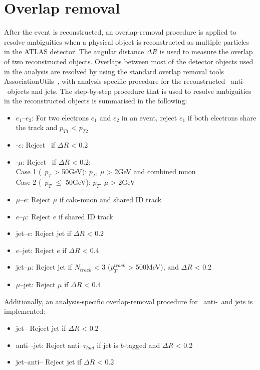 \section{Overlap removal}
After the event is reconstructed, an overlap-removal procedure is applied 
to resolve ambiguities when a physical object is reconstructed as multiple 
particles in the \hbox{ATLAS} detector. The angular distance $\Delta R$ is used 
to measure the overlap of two reconstructed objects.
Overlaps between most of the detector objects used in the analysis are resolved 
by using the standard overlap removal tools AssociationUtils~\cite{ORTool}, 
with analysis specific procedure for 
the reconstructed \tauhadvis\, anti-\tauhadvis\ objects and jets.
The step-by-step procedure that is used to resolve ambiguities in the 
reconstructed objects is summarised in  the following:
 \begin{itemize}
     \item  $e_1$--$e_2$: For two electrons $e_1$ and $e_2$ in an event,  
     reject $e_1$ if both electrons share the track and $p_{T1}$ < $p_{T2}$
    \item  \tauhadvis\--$e$: Reject \tauhadvis\ if $\Delta R$ < 0.2 
    \item  \tauhadvis\--$\mu$: Reject \tauhadvis\ if $\Delta R$ < 0.2:
     \\ Case 1 (\tauhadvis\ $p_T$ > 50GeV): $p_T$, $\mu$ > 2GeV and combined muon
     \\ Case 2 (\tauhadvis\ $p_T$ $\leq$ 50GeV): $p_T$, $\mu$ > 2GeV
    \item  $\mu$--$e$: Reject $\mu$ if calo-muon and shared ID track
    \item  $e$--$\mu$: Reject $e$ if shared ID track
    \item  jet--$e$: Reject jet if $\Delta R$ < 0.2
    \item  $e$--jet: Reject $e$ if $\Delta R$ < 0.4
    \item  jet--$\mu$: Reject jet if $N_{track}$ < 3 ($p_{T}^{track}$ > 500MeV), and $\Delta R$ < 0.2
    \item  $\mu$--jet: Reject $\mu$ if $\Delta R$ < 0.4
 \end{itemize}
 Additionally, an analysis-specific overlap-removal procedure for \tauhadvis\, 
 anti-\tauhadvis\ and jets is implemented:
\begin{itemize}
    \item jet--\tauhadvis\: Reject jet if $\Delta R$ < 0.2
    \item anti--\tauhadvis\--jet: Reject anti--$\tau_{had}$ if jet is $b$-tagged and $\Delta R$ < 0.2
    \item jet--anti--\tauhadvis\: Reject jet if $\Delta R$ < 0.2
\end{itemize}

